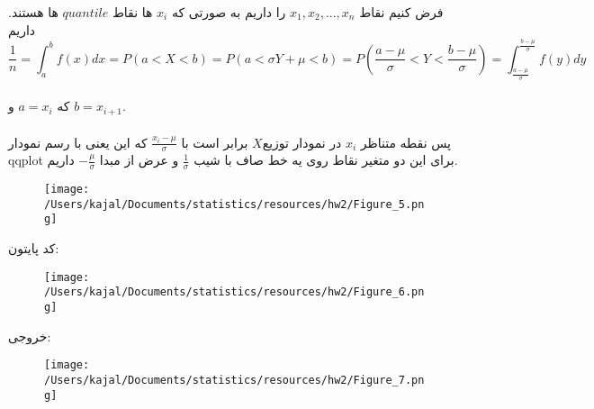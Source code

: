 \problem{}
\subproblem{}
فرض کنیم نقاط $x_1,x_2,...,x_n$ را داریم به صورتی که $x_i$ ها نقاط $quantile$ ها هستند.
داریم \\
\[\frac{1}{n} = \int_{a}^{b} f(x)dx = P(a<X<b) = P(a<\sigma Y +\mu<b) = P(\frac{a-\mu}{\sigma}<Y<\frac{b-\mu}{\sigma}) = \int_{\frac{a-\mu}{\sigma}}^{\frac{b-\mu}{\sigma}} f(y)dy\]\\
که $a = x_i$ و $b = x_{i+1}$.\\\\
پس نقطه متناظر $x_i$   در نمودار توزیع$X$ برابر است با $\frac{x_i-\mu}{\sigma}$ که این یعنی با رسم نمودار 
qqplot برای این دو متغیر نقاط روی یه خط صاف با شیب $\frac{1}{\sigma}$ و عرض از مبدا $-\frac{\mu}{\sigma}$ داریم.
\begin{figure}[H]
	\centering
	\texttt{[image: /Users/kajal/Documents/statistics/resources/hw2/Figure\_5.png]}
\end{figure}
\subproblem{}
کد پایتون:
\begin{figure}[H]
	\centering
	\texttt{[image: /Users/kajal/Documents/statistics/resources/hw2/Figure\_6.png]}
\end{figure}
خروجی:
\begin{figure}[H]
	\centering
	\texttt{[image: /Users/kajal/Documents/statistics/resources/hw2/Figure\_7.png]}
\end{figure}